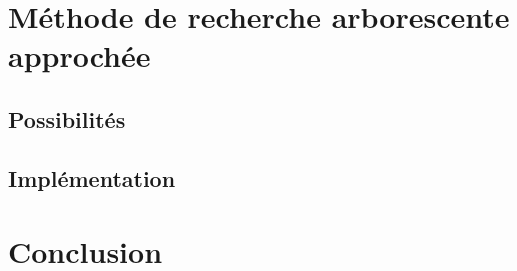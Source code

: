 \documentclass[12pt]{article}
\begin{document}




\clearpage
\newpage
\section{Méthode de recherche arborescente approchée}

\subsection{Possibilités}


\subsection{Implémentation}


\clearpage
\newpage
\section{Conclusion}



\end{document}
